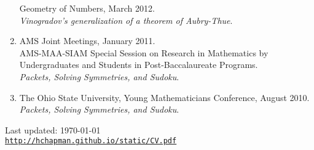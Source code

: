 \documentclass[letterpaper]{article}
\def\footerlink{http://hchapman.github.io/static/CV.pdf}
\begin{document}
\begin{enumerate}
  Geometry of Numbers, March 2012.\\
  \textit{Vinogradov's generalization of a theorem of Aubry-Thue}.
\item AMS Joint Meetings, January 2011.\\
  AMS-MAA-SIAM Special Session on Research in Mathematics by
  Undergraduates and Students in Post-Baccalaureate Programs.\\
  \textit{Packets, Solving Symmetries, and Sudoku}.
\item The Ohio State University, Young Mathematicians Conference,
  August 2010.\\
  \textit{Packets, Solving Symmetries, and Sudoku}.
\end{enumerate}

\bigskip

\begin{center}
  \begin{footnotesize}
    Last updated: \today \\
    \href{\footerlink}{\texttt{\footerlink}}
  \end{footnotesize}
\end{center}
\end{document}
